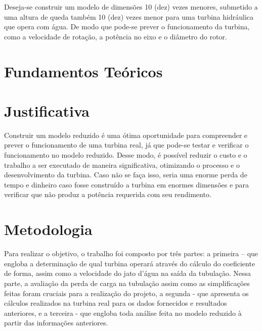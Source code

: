 \documentclass[a4paper, 12pt, openany, oneside, brazil]{abntex2} %
\begin{document}
    Deseja-se construir um modelo de dimensões 10 (dez) vezes menores, submetido a uma altura de queda também 10 (dez) vezes menor para uma turbina hidráulica que opera com água. De modo que pode-se prever o funcionamento da turbina, como a velocidade de rotação, a potência no eixo e o diâmetro do rotor.


\chapter{Fundamentos Teóricos}
% 
% 



\chapter{Justificativa}
    Construir um modelo reduzido é uma ótima oportunidade para compreender e prever o funcionamento de uma turbina real, já que pode-se testar e verificar o funcionamento no modelo reduzido. Desse modo, é possível reduzir o custo e o trabalho a ser executado de maneira significativa, otimizando o processo e o desenvolvimento da turbina. Caso não se faça isso, seria uma enorme perda de tempo e dinheiro caso fosse construído a turbina em enormes dimensões e para verificar que não produz a potência requerida com seu rendimento.

\chapter{Metodologia} %

    Para realizar o objetivo, o trabalho foi composto por três partes: a primeira – que engloba a determinação de qual turbina operará através do cálculo do coeficiente de forma, assim como a velocidade do jato d'água na saída da tubulação. Nessa parte, a avaliação da perda de carga na tubulação assim como as simplificações feitas foram cruciais para a realização do projeto, a segunda - que apresenta os cálculos realizados na turbina real para os dados fornecidos e resultados anteriores, e a terceira - que engloba toda análise feita no modelo reduzido à partir das informações anteriores.

\end{document}
